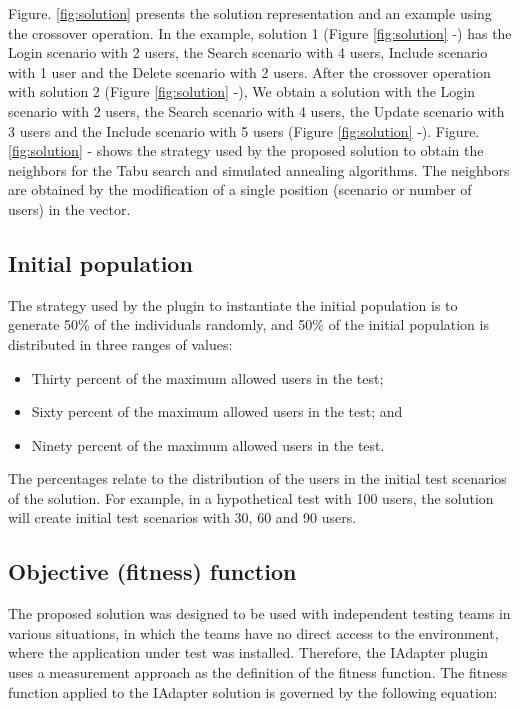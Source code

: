 \documentclass{bmcart}
\begin{document}
Figure. \ref{fig:solution} presents the solution representation and an example using the crossover operation. In the example, solution 1 (Figure \ref{fig:solution}  -) has the Login scenario with 2 users, the Search scenario with 4 users, Include scenario with 1 user and the Delete scenario with 2 users.  After the crossover operation with solution 2 (Figure \ref{fig:solution}  -), We obtain a solution with the Login scenario with 2 users, the Search scenario with 4 users, the Update scenario with 3 users and the Include scenario with 5 users (Figure \ref{fig:solution}  -). Figure. \ref{fig:solution} - shows the strategy used by the proposed solution to  obtain the neighbors for the Tabu search and simulated annealing algorithms. The neighbors are obtained by the modification of a single position (scenario or number of users) in the vector.

\subsection{Initial population}

The strategy used by the plugin to instantiate the initial population is to generate 50\% of the individuals randomly, and 50\% of the initial population is distributed in three ranges of values:

\begin{itemize}
\item Thirty percent of the maximum allowed users in the test;
\item Sixty percent of the maximum allowed users in the test; and
\item Ninety percent of the maximum allowed users in the test.
\end{itemize}

The percentages relate to the distribution of the users in the initial test scenarios of the solution. For example, in a hypothetical test with 100 users, the solution will create initial test scenarios with 30, 60 and 90 users.

\subsection{Objective (fitness) function}

The proposed solution was designed to be used with independent testing teams in various situations, in which the teams have no direct access to the environment, where the application under test was installed. Therefore, the IAdapter plugin uses a measurement approach as the definition of the fitness function. The fitness function applied to the IAdapter solution is governed by the following equation:
\end{document}
